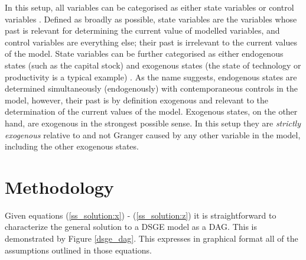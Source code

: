\documentclass{article}
\begin{document}
In this setup, all variables can be categorised as either state variables or control variables \parencite{fernandez2016solution}. Defined as broadly as possible, state variables are the variables whose past is relevant for determining the current value of modelled variables, and control variables are everything else; their past is irrelevant to the current values of the model. State variables can be further categorised as either endogenous states (such as the capital stock) and exogenous states (the state of technology or productivity is a typical example) \parencite{ravenna2007vector}. As the name suggests, endogenous states are determined simultaneously (endogenously) with contemporaneous controls in the model, however, their past is by definition exogenous and relevant to the determination of the current values of the model. Exogenous states, on the other hand, are exogenous in the strongest possible sense. In this setup they are \textit{strictly exogenous} relative to and not Granger caused by any other variable in the model, including the other exogenous states.

\section{Methodology} \label{methodology}

Given equations (\ref{ss_solution:x}) - (\ref{ss_solution:z}) it is straightforward to characterize the general solution to a DSGE model as a DAG. This is demonstrated by Figure \ref{dsge_dag}. This expresses in graphical format all of the assumptions outlined in those equations. 
\end{document}
